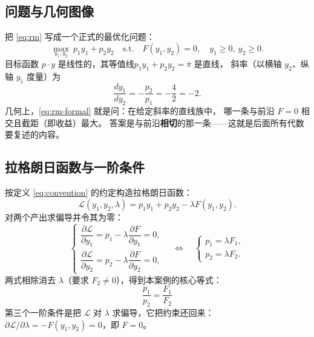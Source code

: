 \subsection{问题与几何图像}

把 \eqref{eq:rm} 写成一个正式的最优化问题：
\begin{equation}
\tag{RM}
\max_{y_1,y_2}\ p_1y_1+p_2y_2
\quad\text{s.t.}\quad F(y_1,y_2)=0,\quad y_1\ge 0,\ y_2\ge 0.
\label{eq:rm-formal}
\end{equation}
目标函数 $p\cdot y$ 是线性的，其等值线$p_1y_1+p_2y_2=\bar{\pi}$ 是直线，
斜率（以横轴 $y_2$、纵轴 $y_1$ 度量）为
\begin{equation}
\frac{dy_1}{dy_2}=-\frac{p_2}{p_1}=-\frac{4}{2}=-2.
\label{eq:isor-slope}
\end{equation}
几何上，\eqref{eq:rm-formal} 就是问：在给定斜率的直线族中，
哪一条与前沿 $F=0$ 相交且截距（即收益）最大。
答案是与前沿\textbf{相切}的那一条——这就是后面所有代数要复述的内容。

\subsection{拉格朗日函数与一阶条件}

按定义 \ref{eq:convention} 的约定构造拉格朗日函数：
\begin{equation}
\mathcal{L}(y_1,y_2,\lambda)=p_1y_1+p_2y_2-\lambda F(y_1,y_2).
\label{eq:lagrange}
\end{equation}
对两个产出求偏导并令其为零：
\begin{equation}
\begin{cases}
\dfrac{\partial \mathcal{L}}{\partial y_1}=p_1-\lambda\dfrac{\partial F}{\partial y_1}=0,\\[8pt]
\dfrac{\partial \mathcal{L}}{\partial y_2}=p_2-\lambda\dfrac{\partial F}{\partial y_2}=0,
\end{cases}
\quad\Longleftrightarrow\quad
\begin{cases}
p_1=\lambda F_1,\\
p_2=\lambda F_2.
\end{cases}
\label{eq:foc}
\end{equation}
两式相除消去 $\lambda$（要求 $F_2\neq 0$），得到本案例的核心等式：
\begin{equation}
\boxed{\ \frac{p_1}{p_2}=\frac{F_1}{F_2}\ }
\label{eq:core}
\end{equation}
第三个一阶条件是把 $\mathcal{L}$ 对 $\lambda$ 求偏导，它把约束还回来：
$\partial \mathcal{L}/\partial \lambda=-F(y_1,y_2)=0$，即 $F=0$。

